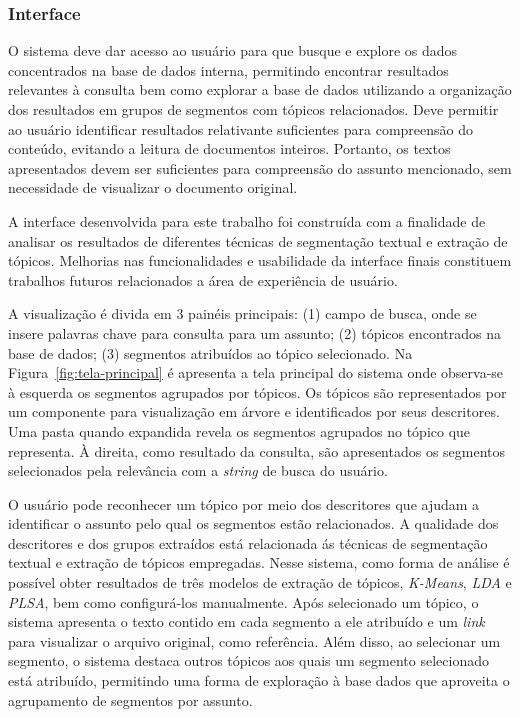 \subsubsection{Interface}

O sistema deve dar acesso ao usuário para que busque e explore os dados concentrados na base de dados interna, permitindo encontrar resultados relevantes à consulta bem como explorar a base de dados utilizando a organização dos resultados em grupos de segmentos com tópicos relacionados. Deve permitir ao usuário identificar resultados relativante suficientes para compreensão do conteúdo, evitando a leitura de documentos inteiros. Portanto, os textos apresentados devem ser suficientes para compreensão do assunto mencionado, sem necessidade de visualizar o documento original.

A interface desenvolvida para este trabalho foi construída com a finalidade de analisar os resultados de diferentes técnicas de segmentação textual e extração de tópicos. Melhorias nas funcionalidades e usabilidade da interface finais constituem trabalhos futuros relacionados a área de experiência de usuário.

A visualização é divida em 3 painéis principais: (1) campo de busca, onde se insere palavras chave para consulta para um assunto; (2) tópicos encontrados na base de dados; (3) segmentos atribuídos ao tópico selecionado. 
Na Figura~\ref{fig:tela-principal} é apresenta a tela principal do sistema onde observa-se à esquerda os segmentos agrupados por tópicos. Os tópicos são representados por um componente para visualização em árvore e identificados por seus descritores. 
Uma pasta quando expandida revela os segmentos agrupados no tópico que representa. À direita, como resultado da consulta, são apresentados os segmentos selecionados pela relevância com a \textit{string} de busca do usuário. 





O usuário pode reconhecer um tópico por meio dos descritores que ajudam a identificar o assunto pelo qual os segmentos estão relacionados. A qualidade dos descritores e dos grupos extraídos está relacionada ás técnicas de segmentação textual e extração de tópicos empregadas. Nesse sistema, como forma de análise é possível obter resultados de três modelos de extração de tópicos, \textit{K-Means}, \textit{LDA} e \textit{PLSA}, bem como configurá-los manualmente. 
Após selecionado um tópico, o sistema apresenta o texto contido em cada segmento a ele atribuído e um \textit{link} para visualizar o arquivo original, como referência. Além disso, ao selecionar um segmento, o sistema destaca outros tópicos aos quais um segmento selecionado está atribuído, permitindo uma forma de exploração à base dados que aproveita o agrupamento de segmentos por assunto.




